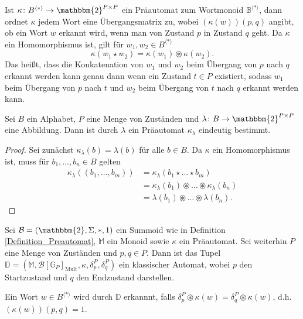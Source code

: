 \documentclass{article}
\begin{document}
\begin{remark}
  Ist $\kappa \colon B^{\langle \ast \rangle} \to \mathbbm{2}^{P \times P}$ ein Präautomat zum Wortmonoid $\mathbb{B}^{\langle \ast \rangle}$,
  dann ordnet $\kappa$ jedem Wort eine Übergangsmatrix zu,
  wobei $(\kappa(w))(p, q)$ angibt, ob ein Wort $w$
  erkannt wird, wenn man von Zustand $p$ in Zustand $q$ geht.
  Da $\kappa$ ein Homomorphismus ist, gilt für $w_1, w_2 \in B^{\langle \ast \rangle}$
  \begin{equation*}
    \kappa(w_1 \star w_2) = \kappa(w_1) \circledast \kappa(w_2).
  \end{equation*}
  Das heißt, dass die Konkatenation von $w_1$ und $w_2$ beim
  Übergang von $p$ nach $q$ erkannt werden kann
  genau dann wenn ein Zustand $t \in P$ existiert,
  sodass $w_1$ beim Übergang von $p$ nach $t$
  und $w_2$ beim Übergang von $t$ nach $q$ erkannt werden kann.
\end{remark}

\begin{theorem}
  Sei $B$ ein Alphabet, $P$ eine Menge von Zuständen
  und $\lambda \colon B \to \mathbbm{2}^{P \times P}$ eine Abbildung.
  Dann ist durch $\lambda$ ein Präautomat $\kappa_\lambda$ eindeutig bestimmt.
\end{theorem}
\begin{proof}
  Sei zunächst $\kappa_\lambda(b) = \lambda(b)$ für alle $b \in B$.
  Da $\kappa$ ein Homomorphismus ist, muss für $b_1, \dots, b_n \in B$ gelten
  \begin{align*}
    \kappa_\lambda((b_1, \dots, b_m))
    &= \kappa_\lambda(b_1 \star \dots \star b_m) \\
    &= \kappa_\lambda(b_1) \circledast \dots \circledast \kappa_\lambda(b_n) \\
    &= \lambda(b_1) \circledast \dots \circledast \lambda(b_n).
  \end{align*}
\end{proof}

\begin{definition}
  Sei $\mathcal{B} = (\mathbbm{2}, \Sigma, \ast, 1)$ ein Summoid wie in Definition \ref{Definition_Preautomat},
  $\mathbb{M}$ ein Monoid
  sowie $\kappa$ ein Präautomat.
  Sei weiterhin $P$ eine Menge von Zuständen
  und $p, q \in P$.
  Dann ist das Tupel $\mathbb{D} = (\mathbb{M}, \mathcal{B}[\mathbb{G}_P]_\text{Mult}, \kappa, \delta^P_p, \delta^P_q)$
  ein klassischer Automat,
  wobei $p$ den Startzustand und $q$ den Endzustand darstellen.

  Ein Wort $w \in B^{\langle \ast \rangle}$ wird durch $\mathbb{D}$ erkannnt,
  falls $\delta^P_p \circledast \kappa(w) = \delta^P_q \circledast \kappa(w)$,
  d.h. $(\kappa(w))(p, q) = 1$.
\end{definition}
\end{document}
